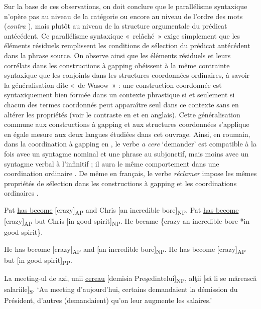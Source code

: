 Sur la base de ces observations, on doit conclure que le parallélisme syntaxique n’opère pas au niveau de la catégorie ou encore au niveau de l’ordre des mots (\textit{contra} \citealt{Hartmann2000,CulicoverEtAl2005,Culicover2009}), mais plutôt au niveau de la structure argumentale du prédicat antécédent. Ce parallélisme syntaxique «~relâché~» exige simplement que les éléments résiduels remplissent les conditions de sélection du prédicat antécédent dans la phrase source. On observe ainsi que les éléments résiduels et leurs corrélats dans les constructions à gapping obéissent à la même contrainte syntaxique que les conjoints dans les structures coordonnées ordinaires, à savoir la généralisation dite «~de Wasow~» \citep{GazdarEtAl1985,PullumEtAl1986} : une construction coordonnée est syntaxiquement bien formée dans un contexte phrastique si et seulement si chacun des termes coordonnés peut apparaître seul dans ce contexte sans en altérer les propriétés (voir le contraste en  et  en anglais). Cette généralisation commune aux constructions à gapping et aux structures coordonnées s’applique en égale mesure aux deux langues étudiées dans cet ouvrage. Ainsi, en roumain, dans la coordination à gapping en , le verbe \textit{a cere} ‘demander’ est compatible à la fois avec un syntagme nominal et une phrase au subjonctif, mais moins avec un syntagme verbal à l’infinitif ; il aura le même comportement dans une coordination ordinaire . De même en français, le verbe \textit{réclamer} impose les mêmes propriétés de sélection dans les constructions à gapping  et les coordinations ordinaires . 

\ea \label{ch2:ex141}
\ea  Pat \uline{has become} [crazy]\textsubscript{AP} and Chris [an incredible bore]\textsubscript{NP}.
\ex *Pat \uline{has become} [crazy]\textsubscript{AP} but Chris [in good spirit]\textsubscript{NP}.
\ex  He became \{crazy {\textbar} an incredible bore {\textbar} *in good spirit\}. \citep[156--158]{SagEtAl1985}
\z
\z

\ea \label{ch2:ex142}
\ea He has become [crazy]\textsubscript{AP} and [an incredible bore]\textsubscript{NP}.
\ex *He has become [crazy]\textsubscript{AP} but [in good spirit]\textsubscript{PP}.
\z
\z

\ea \label{ch2:ex143}
\ea La meeting-ul de azi, unii \uline{cereau} [demisia Preşedintelui]\textsubscript{NP}, alţii [să li se mărească salariile]\textsubscript{S}.\textsubscript{} 
\glt  ‘Au meeting d’aujourd’hui, certains demandaient la démission du Président, d’autres (demandaient) qu’on leur augmente les salaires.’

